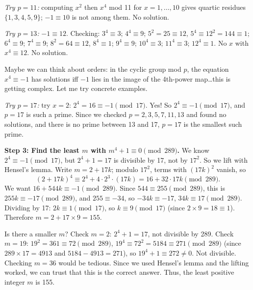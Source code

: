 \begin{ReasoningBox}[title={Case Study: Math Reasoning (Pre-RL / Post-RL Setting)}, breakable]
\textit{Try $p=11$:} computing $x^2$ then $x^4$ mod 11 for $x = 1, \dots, 10$ gives quartic residues $\{1, 3, 4, 5, 9\}$; $-1 \equiv 10$ is not among them. No solution.

\textit{Try $p=13$:} $-1 \equiv 12$. Checking: $3^4 \equiv 3$; $4^4 \equiv 9$; $5^2 = 25 \equiv 12$, $5^4 \equiv 12^2 = 144 \equiv 1$; $6^4 \equiv 9$; $7^4 \equiv 9$; $8^2 = 64 \equiv 12$, $8^4 \equiv 1$; $9^4 \equiv 9$; $10^4 \equiv 3$; $11^4 \equiv 3$; $12^4 \equiv 1$. No $x$ with $x^4 \equiv 12$. No solution.

Maybe we can think about orders: in the cyclic group mod $p$, the equation $x^4 \equiv -1$ has solutions iff $-1$ lies in the image of the 4th-power map\dots this is getting complex. Let me try concrete examples.

\textit{Try $p=17$:} try $x = 2$: $2^4 = 16 \equiv -1 \pmod{17}$. Yes! So $2^4 \equiv -1 \pmod{17}$, and $p = 17$ is such a prime. Since we checked $p = 2, 3, 5, 7, 11, 13$ and found no solutions, and there is no prime between 13 and 17, $p = 17$ is the smallest such prime.

\textbf{Step 3: Find the least $m$ with $m^4 + 1 \equiv 0 \pmod{289}$.} We know $2^4 \equiv -1 \pmod{17}$, but $2^4 + 1 = 17$ is divisible by 17, not by $17^2$. So we lift with Hensel's lemma. Write $m = 2 + 17k$; modulo $17^2$, terms with $(17k)^2$ vanish, so
\[
(2 + 17k)^4 \equiv 2^4 + 4 \cdot 2^3 \cdot (17k) = 16 + 32 \cdot 17k \pmod{289}.
\]
We want $16 + 544k \equiv -1 \pmod{289}$. Since $544 \equiv 255 \pmod{289}$, this is $255k \equiv -17 \pmod{289}$, and $255 \equiv -34$, so $-34k \equiv -17$, \ie $34k \equiv 17 \pmod{289}$. Dividing by 17: $2k \equiv 1 \pmod{17}$, so $k \equiv 9 \pmod{17}$ (since $2 \times 9 = 18 \equiv 1$). Therefore $m = 2 + 17 \times 9 = 155$.

Is there a smaller $m$?  Check $m = 2$: $2^4 + 1 = 17$, not divisible by 289. Check $m = 19$: $19^2 = 361 \equiv 72 \pmod{289}$, $19^4 \equiv 72^2 = 5184 \equiv 271 \pmod{289}$ (since $289 \times 17 = 4913$ and $5184 - 4913 = 271$), so $19^4 + 1 \equiv 272 \neq 0$. Not divisible. Checking $m = 36$ would be tedious.  Since we used Hensel's lemma and the lifting worked, we can trust that this is the correct answer. Thus, the least positive integer $m$ is 155.

 \quad {}


\end{ReasoningBox}
